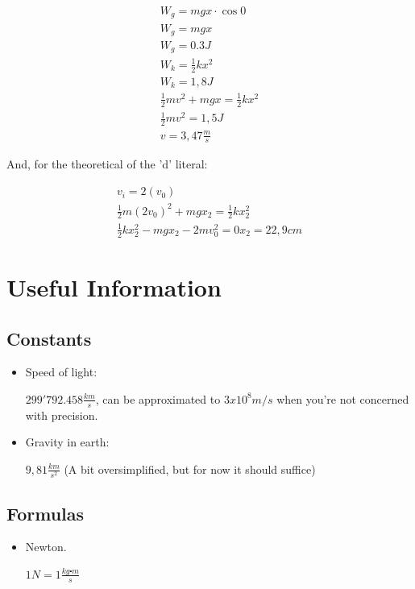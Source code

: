\documentclass[11pt,fleqn]{book} %
\begin{document}
\begin{gather}
    W_g = mg x \cdot \cos{0}\\
    W_g = mgx \\
    W_g = 0.3J\\
    W_k = \frac{1}{2} k x^2\\
    W_k = 1,8 J\\
    \frac{1}{2} mv^2 + mgx = \frac{1}{2}kx^2\\
    \frac{1}{2}mv^2 = 1,5J\\
    v = 3,47 \frac{m}{s}
\end{gather}

And, for the theoretical of the 'd' literal:

\begin{gather}
    v_i = 2(v_0)\\
    \frac{1}{2}m(2 v_0)^2 + mgx_2 =\frac{1}{2} kx_2^2\\
    \frac{1}{2} k x_2^2 - mgx_2 - 2 mv_0^2 = 0
    x_2 = 22,9 cm
\end{gather}

\chapter{Useful Information}

\section{Constants}
\begin{itemize}

    \item Speed of light: 
    
    $299'792.458 \frac{km}{s}$, can be approximated to $ 3x10^8 m/s $ when you're not concerned with precision.

    \item Gravity in earth: 
    
    $ 9,81 \frac{km}{s^2}$ (A bit oversimplified, but for now it should suffice)

\end{itemize}
\section{Formulas}
\begin{itemize}
    \item Newton.
    
    $ 1N = 1 \frac{kg \centerdot m}{s} $
\end{itemize}
\end{document}
